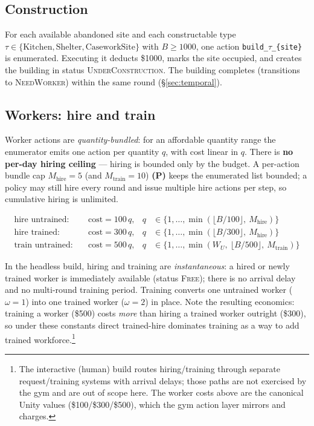\documentclass[11pt]{article}
\newcommand{\code}[1]{\texttt{\small #1}}
\begin{document}
\subsection{Construction}
For each available abandoned site and each constructable type
$\tau \in \{\text{Kitchen},\text{Shelter},\text{CaseworkSite}\}$ with
$B \geq 1000$, one action \code{build\_$\tau$\_\{site\}} is enumerated. Executing
it deducts \$1000, marks the site occupied, and creates the building in status
\textsc{UnderConstruction}. The building completes (transitions to
\textsc{NeedWorker}) within the same round (\S\ref{sec:temporal}).

\subsection{Workers: hire and train}
\label{sec:actions:worker}
Worker actions are \emph{quantity-bundled}: for an affordable quantity range the
enumerator emits one action per quantity $q$, with cost linear in $q$. There is
\textbf{no per-day hiring ceiling} --- hiring is bounded only by the budget. A
per-action bundle cap $M_{\text{hire}} = 5$ (and $M_{\text{train}}=10$)
\textbf{(P)} keeps the enumerated list bounded; a policy may still hire every
round and issue multiple hire actions per step, so cumulative hiring is
unlimited.

\begin{align}
\text{hire untrained:} &\quad \mathrm{cost} = 100\,q, &
  q &\in \{1,\dots,\min(\lfloor B/100\rfloor,\ M_{\text{hire}})\} \\
\text{hire trained:} &\quad \mathrm{cost} = 300\,q, &
  q &\in \{1,\dots,\min(\lfloor B/300\rfloor,\ M_{\text{hire}})\} \\
\text{train untrained:} &\quad \mathrm{cost} = 500\,q, &
  q &\in \{1,\dots,\min(W_U,\ \lfloor B/500\rfloor,\ M_{\text{train}})\}
\end{align}

In the headless build, hiring and training are \emph{instantaneous}: a hired or
newly trained worker is immediately available (status \textsc{Free}); there is
no arrival delay and no multi-round training period. Training converts one
untrained worker ($\omega=1$) into one trained worker ($\omega=2$) in place.
Note the resulting economics: training a worker (\$500) costs \emph{more} than
hiring a trained worker outright (\$300), so under these constants direct
trained-hire dominates training as a way to add trained
workforce.\footnote{The interactive (human) build routes hiring/training through
separate request/training systems with arrival delays; those paths are not
exercised by the gym and are out of scope here. The worker costs above are the
canonical Unity values (\$100/\$300/\$500), which the gym action layer mirrors
and charges.}
\end{document}
